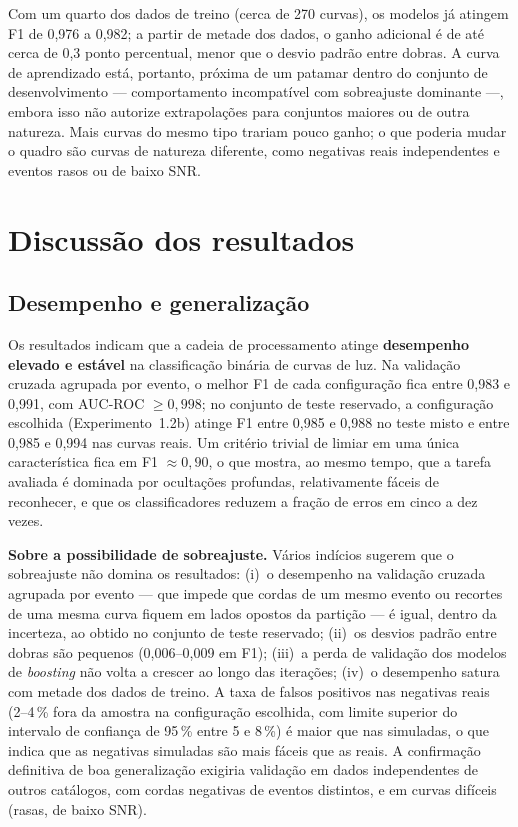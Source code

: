Com um quarto dos dados de treino (cerca de 270 curvas), os modelos já atingem F1 de 0,976 a 0,982; a partir de metade dos dados, o ganho adicional é de até cerca de 0,3 ponto percentual, menor que o desvio padrão entre dobras. A curva de aprendizado está, portanto, próxima de um patamar dentro do conjunto de desenvolvimento --- comportamento incompatível com sobreajuste dominante ---, embora isso não autorize extrapolações para conjuntos maiores ou de outra natureza. Mais curvas do mesmo tipo trariam pouco ganho; o que poderia mudar o quadro são curvas de natureza diferente, como negativas reais independentes e eventos rasos ou de baixo SNR.

\section{Discussão dos resultados}
\label{sec:discussao}

\subsection{Desempenho e generalização}

Os resultados indicam que a cadeia de processamento atinge \textbf{desempenho elevado e estável} na classificação binária de curvas de luz. Na validação cruzada agrupada por evento, o melhor F1 de cada configuração fica entre 0,983 e 0,991, com AUC-ROC $\geq 0{,}998$; no conjunto de teste reservado, a configuração escolhida (Experimento~1.2b) atinge F1 entre 0,985 e 0,988 no teste misto e entre 0,985 e 0,994 nas curvas reais. Um critério trivial de limiar em uma única característica fica em F1 $\approx 0{,}90$, o que mostra, ao mesmo tempo, que a tarefa avaliada é dominada por ocultações profundas, relativamente fáceis de reconhecer, e que os classificadores reduzem a fração de erros em cinco a dez vezes.

\textbf{Sobre a possibilidade de sobreajuste.} Vários indícios sugerem que o sobreajuste não domina os resultados: (i)~o desempenho na validação cruzada agrupada por evento --- que impede que cordas de um mesmo evento ou recortes de uma mesma curva fiquem em lados opostos da partição --- é igual, dentro da incerteza, ao obtido no conjunto de teste reservado; (ii)~os desvios padrão entre dobras são pequenos (0,006--0,009 em F1); (iii)~a perda de validação dos modelos de \textit{boosting} não volta a crescer ao longo das iterações; (iv)~o desempenho satura com metade dos dados de treino. A taxa de falsos positivos nas negativas reais (2--4\,\% fora da amostra na configuração escolhida, com limite superior do intervalo de confiança de 95\,\% entre 5 e 8\,\%) é maior que nas simuladas, o que indica que as negativas simuladas são mais fáceis que as reais. A confirmação definitiva de boa generalização exigiria validação em dados independentes de outros catálogos, com cordas negativas de eventos distintos, e em curvas difíceis (rasas, de baixo SNR).

